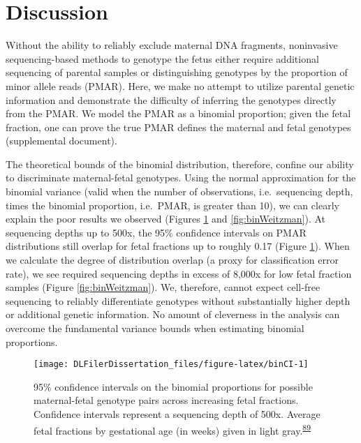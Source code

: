 \documentclass[11pt,letterpaper]{book}
\begin{document}
\hypertarget{discussion-1}{%
\section{Discussion}\label{discussion-1}}

Without the ability to reliably exclude maternal DNA fragments, noninvasive sequencing-based methods to genotype the fetus either require additional sequencing of parental samples or distinguishing genotypes by the proportion of minor allele reads (PMAR).
Here, we make no attempt to utilize parental genetic information and demonstrate the difficulty of inferring the genotypes directly from the PMAR.
We model the PMAR as a binomial proportion; given the fetal fraction, one can prove the true PMAR defines the maternal and fetal genotypes (supplemental document).

The theoretical bounds of the binomial distribution, therefore, confine our ability to discriminate maternal-fetal genotypes.
Using the normal approximation for the binomial variance (valid when the number of observations, i.e.~sequencing depth, times the binomial proportion, i.e.~PMAR, is greater than 10), we can clearly explain the poor results we observed (Figures \ref{fig:binCI} and \ref{fig:binWeitzman}).
At sequencing depths up to 500x, the 95\% confidence intervals on PMAR distributions still overlap for fetal fractions up to roughly 0.17 (Figure \ref{fig:binCI}).
When we calculate the degree of distribution overlap (a proxy for classification error rate), we see required sequencing depths in excess of 8,000x for low fetal fraction samples (Figure \ref{fig:binWeitzman}).
We, therefore, cannot expect cell-free sequencing to reliably differentiate genotypes without substantially higher depth or additional genetic information.
No amount of cleverness in the analysis can overcome the fundamental variance bounds when estimating binomial proportions.





\begin{figure}

{\centering \texttt{[image: DLFilerDissertation\_files/figure-latex/binCI-1]} 

}

\caption[95\% confidence intervals on the binomial proportions for possible maternal-fetal genotype pairs.]{95\% confidence intervals on the binomial proportions for possible maternal-fetal genotype pairs across increasing fetal fractions. Confidence intervals represent a sequencing depth of 500x. Average fetal fractions by gestational age (in weeks) given in light gray.\textsuperscript{\protect\hyperlink{ref-kinnings:2015aa}{89}}}\label{fig:binCI}
\end{figure}
\end{document}

